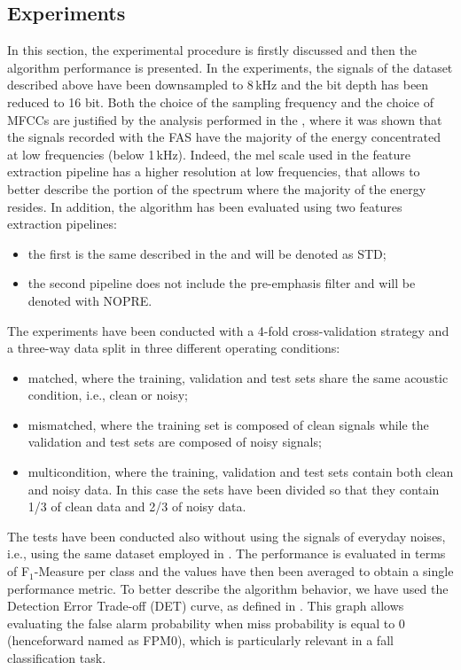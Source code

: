 \subsection{Experiments}\label{sec:exp}
In this section, the experimental procedure is firstly discussed and then the algorithm performance is presented. In the experiments, the signals of the dataset described above have been downsampled to 8\,kHz and the bit depth has been reduced to 16 bit. Both the choice of the sampling frequency and the choice of MFCCs are justified by the analysis performed in the , where it was shown that the signals recorded with the FAS have the majority of the energy concentrated at low frequencies (below 1\,kHz). Indeed, the mel scale used in the feature extraction pipeline has a higher resolution at low frequencies, that allows to better describe the portion of the spectrum where the majority of the energy resides. In addition, the algorithm has been evaluated using two features extraction pipelines:
\begin{itemize}
	\item the first is the same described in the  and will be denoted as STD; %
	\item the second pipeline does not include the pre-emphasis filter and will be denoted with NOPRE.
\end{itemize}

The experiments have been conducted with a 4-fold cross-validation strategy and a three-way data split in three different operating conditions:
\begin{itemize}
	\item matched, where the training, validation and test sets share the same acoustic condition, i.e., clean or noisy;
	\item mismatched, where the training set is composed of clean signals while the validation and test sets are composed of noisy signals;
	\item multicondition, where the training, validation and test sets contain both clean and noisy data. In this case the sets have been divided so that they contain 1/3 of clean data and 2/3 of noisy data.
\end{itemize}

The tests have been conducted also without using the signals of everyday noises, i.e., using the same dataset employed in . The performance is evaluated in terms of F$_1$-Measure per class and the values have then been averaged to obtain a single performance metric. To better describe the algorithm behavior, we have used the Detection Error Trade-off (DET) curve, as defined in \cite{Martin97}. This graph allows evaluating the false alarm probability when miss probability is equal to 0 (henceforward named as FPM0), which is particularly relevant in a fall classification task.

